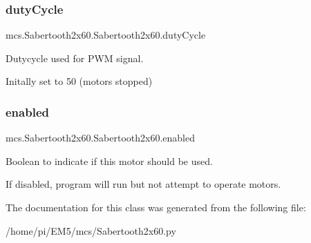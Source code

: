 \subsubsection{\texorpdfstring{duty\+Cycle}{dutyCycle}}
{\footnotesize\ttfamily mcs.\+Sabertooth2x60.\+Sabertooth2x60.\+duty\+Cycle}



Dutycycle used for P\+WM signal. 

Initally set to 50 (motors stopped) \mbox{\label{classmcs_1_1Sabertooth2x60_1_1Sabertooth2x60_a5841fe4acd53f784c65025697c4c81b6}} 
\subsubsection{\texorpdfstring{enabled}{enabled}}
{\footnotesize\ttfamily mcs.\+Sabertooth2x60.\+Sabertooth2x60.\+enabled}



Boolean to indicate if this motor should be used. 

If disabled, program will run but not attempt to operate motors. 

The documentation for this class was generated from the following file\+:\begin{DoxyCompactItemize}
\item 
/home/pi/\+E\+M5/mcs/Sabertooth2x60.\+py\end{DoxyCompactItemize}
